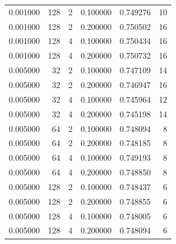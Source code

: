 \begin{longtable}{rrrrrr}
0.001000 & 128 & 2 & 0.100000 & 0.749276 & 10 \\
0.001000 & 128 & 2 & 0.200000 & 0.750502 & 16 \\
0.001000 & 128 & 4 & 0.100000 & 0.750434 & 16 \\
0.001000 & 128 & 4 & 0.200000 & 0.750732 & 16 \\
0.005000 & 32 & 2 & 0.100000 & 0.747109 & 14 \\
0.005000 & 32 & 2 & 0.200000 & 0.746947 & 16 \\
0.005000 & 32 & 4 & 0.100000 & 0.745964 & 12 \\
0.005000 & 32 & 4 & 0.200000 & 0.745198 & 14 \\
0.005000 & 64 & 2 & 0.100000 & 0.748094 & 8 \\
0.005000 & 64 & 2 & 0.200000 & 0.748185 & 8 \\
0.005000 & 64 & 4 & 0.100000 & 0.749193 & 8 \\
0.005000 & 64 & 4 & 0.200000 & 0.748850 & 8 \\
0.005000 & 128 & 2 & 0.100000 & 0.748437 & 6 \\
0.005000 & 128 & 2 & 0.200000 & 0.748855 & 6 \\
0.005000 & 128 & 4 & 0.100000 & 0.748005 & 6 \\
0.005000 & 128 & 4 & 0.200000 & 0.748094 & 6 \\
\end{longtable}
